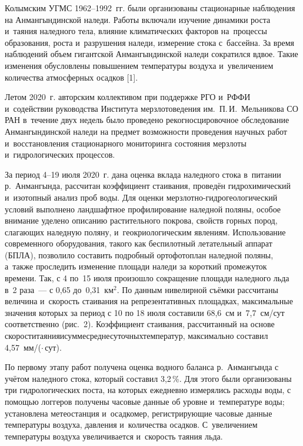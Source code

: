 Колымским УГМС 1962--1992~гг. были организованы стационарные наблюдения на Анмангындинской наледи. Работы включали изучение динамики роста и~таяния наледного тела, влияние климатических факторов на~процессы образования, роста и~разрушения наледи, измерение стока с~бассейна. За время наблюдений объем гигантской Анмангындинской наледи сократился вдвое. Такие изменения обусловлены повышением температуры воздуха и~увеличением количества атмосферных осадков [1].

Летом 2020~г. авторским коллективом при поддержке РГО и~РФФИ и~содействии руководства Института мерзлотоведения им.~П.\,И.~Мельникова СО РАН в~течение двух недель было проведено рекогносцировочное обследование Анмангындинской наледи на предмет возможности проведения научных работ и~восстановления стационарного мониторинга состояния мерзлоты и~гидрологических процессов.

За период 4--19 июля 2020~г. дана оценка вклада наледного стока в~питании р.~Анмангында, рассчитан коэффициент стаивания, проведён гидрохимический и~изотопный анализ проб воды. Для оценки мерзлотно-гидрогеологический условий выполнено ландшафтное профилирование наледной поляны, особое внимание уделено описанию растительного покрова, свойств горных пород, слагающих наледную поляну, и~геокриологическим явлениям. Использование современного оборудования, такого как беспилотный летательный аппарат (БПЛА), позволило составить подробный ортофотоплан наледной поляны, а~также проследить изменение площади наледи за короткий промежуток времени. Так, с 4 по~15 июля произошло сокращение площади наледного льда в~2 раза~--- с 0,65 до~0,31~км$^2$. По данным нивелирной съёмки рассчитаны величина и~скорость стаивания на репрезентативных площадках, максимальные значения которых за период с 10 по 18 июля составили 68,6~см и~7,7~см/сут соответственно (рис.~2). Коэффициент стаивания, рассчитанный на основе скорости\;\;таяния\;\;и\;\;сумме\;\;среднесуточных\;\;температур, максимально составил 4,57~мм/(\dgc$\cdot$\,сут).



По первому этапу работ получена оценка водного баланса р.~Анмангында с учётом наледного стока, который составил 3,2\,\%. Для этого были организованы три гидрологических поста, на которых ежедневно измерялись расходы воды, с помощью логгеров получены часовые данные об уровне и~температуре воды; установлена метеостанция и~осадкомер, регистрирующие часовые данные температуры воздуха, давления и~количества осадков. С~увеличением температуры воздуха увеличивается и~скорость таяния льда.

